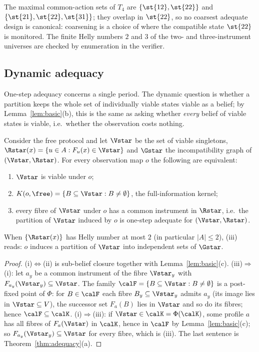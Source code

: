 The maximal common-action sets of $T_4$ are $\{\st{12},\st{22}\}$ and $\{\st{21},\st{22},\st{31}\}$; they overlap in $\st{22}$, so no coarsest adequate design is canonical: coarsening is a choice of where the compatible state $\st{22}$ is monitored. The finite Helly numbers $2$ and $3$ of the two- and three-instrument universes are checked by enumeration in the verifier.

\subsection{Dynamic adequacy}

One-step adequacy concerns a single period. The dynamic question is whether a partition keeps the whole set of individually viable states viable as a belief; by Lemma~\ref{lem:basic}(b), this is the same as asking whether \emph{every} belief of viable states is viable, i.e.\ whether the observation costs nothing.

\begin{theorem}\label{thm:dynamic}
Consider the free protocol and let $\Vstar$ be the set of viable singletons, $\Rstar(x)=\{u\in A:F_u(x)\in\Vstar\}$ and $\Gstar$ the incompatibility graph of $(\Vstar,\Rstar)$. For every observation map $o$ the following are equivalent:
\begin{enumerate}[label=(\roman*),leftmargin=2em,itemsep=1pt]
\item $\Vstar$ is viable under $o$;
\item $K(o,\free)=\{B\subseteq\Vstar:B\neq\emptyset\}$, the full-information kernel;
\item every fibre of $\Vstar$ under $o$ has a common instrument in $\Rstar$, i.e.\ the partition of $\Vstar$ induced by $o$ is one-step adequate for $(\Vstar,\Rstar)$.
\end{enumerate}
When $\{\Rstar(x)\}$ has Helly number at most $2$ (in particular $|A|\le 2$), (iii) reads: $o$ induces a partition of $\Vstar$ into independent sets of $\Gstar$.
\end{theorem}

\begin{proof}
(i)$\Leftrightarrow$(ii) is sub-belief closure together with Lemma~\ref{lem:basic}(c). (iii)$\Rightarrow$(i): let $a_y$ be a common instrument of the fibre $\Vstar_y$ with $F_{a_y}(\Vstar_y)\subseteq\Vstar$. The family $\calF=\{B\subseteq\Vstar: B\neq\emptyset\}$ is a post-fixed point of $\Phi$: for $B\in\calF$ each fibre $B_y\subseteq\Vstar_y$ admits $a_y$ (its image lies in $\Vstar\subseteq V$), the successor set $F_a(B)$ lies in $\Vstar$ and so do its fibres; hence $\calF\subseteq\calK$. (i)$\Rightarrow$(iii): if $\Vstar\in\calK=\Phi(\calK)$, some profile $a$ has all fibres of $F_a(\Vstar)$ in $\calK$, hence in $\calF$ by Lemma~\ref{lem:basic}(c); so $F_{a_y}(\Vstar_y)\subseteq\Vstar$ for every fibre, which is (iii). The last sentence is Theorem~\ref{thm:adequacy}(a).
\end{proof}

